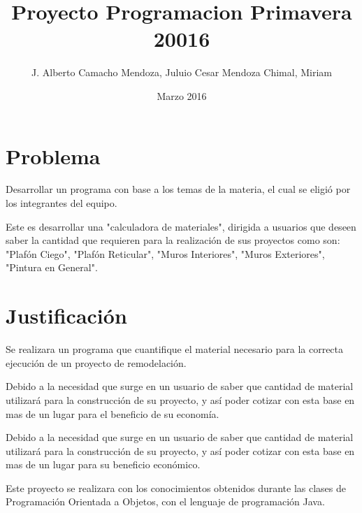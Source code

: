 \documentclass{report}
\title{Proyecto Programacion Primavera 20016}
\author{J. Alberto Camacho Mendoza, Juluio Cesar Mendoza Chimal, Miriam}
\date{Marzo 2016}
\begin{document}
\maketitle

\section{Problema}

Desarrollar un programa con base a los temas de la materia, el cual se eligió por los integrantes del equipo.\newline

Este es desarrollar una "calculadora de materiales", dirigida a usuarios que deseen saber la cantidad que requieren para la realización de sus proyectos como son: "Plafón Ciego", "Plafón Reticular", "Muros Interiores", "Muros Exteriores", "Pintura en General".\newline
\newline
\newline

\section{Justificación}

Se realizara un programa que cuantifique el material necesario para la correcta ejecución de un proyecto de remodelación.\newline

Debido a la necesidad que surge en un usuario de saber que cantidad de material utilizará para la construcción de su proyecto, y así poder cotizar con esta base en mas de un lugar para el beneficio de su economía. \newline


Debido a la necesidad que surge en un usuario de saber que cantidad de material utilizará para la construcción de su proyecto, y así poder cotizar con esta base en mas de un lugar para su beneficio económico.\newline

Este proyecto se realizara con los conocimientos obtenidos durante las clases de Programación Orientada a Objetos, con el lenguaje de programación
Java.\newline
\newline
\newline
\section{}
\end{document}
